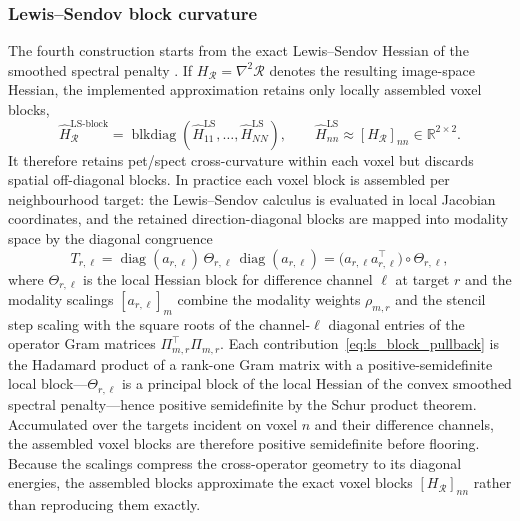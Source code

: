 \subsubsection{Lewis--Sendov block curvature}

The fourth construction starts from the exact Lewis--Sendov Hessian of the smoothed spectral penalty \cite{doi:10.1137/S089547980036838X}. If $H_{\mathcal R}=\nabla^2\mathcal R$ denotes the resulting image-space Hessian, the implemented approximation retains only locally assembled voxel blocks,
\begin{equation}
    \widehat H_{\mathcal R}^{\mathrm{LS\text{-}block}}
    =
    \operatorname{blkdiag}
    \left(
        \widehat H_{11}^{\mathrm{LS}},\ldots,\widehat H_{NN}^{\mathrm{LS}}
    \right),
    \qquad
    \widehat H_{nn}^{\mathrm{LS}}\approx[H_{\mathcal R}]_{nn}\in\mathbb R^{2\times2}.
    \label{eq:ls_block_preconditioner}
\end{equation}
It therefore retains \gls{pet}/\gls{spect} cross-curvature within each voxel but discards spatial off-diagonal blocks. In practice each voxel block is assembled per neighbourhood target: the Lewis--Sendov calculus is evaluated in local Jacobian coordinates, and the retained direction-diagonal blocks are mapped into modality space by the diagonal congruence
\begin{equation}
    T_{r,\ell}
    =
    \operatorname{diag}(a_{r,\ell})\,
    \Theta_{r,\ell}\,
    \operatorname{diag}(a_{r,\ell})
    =
    \bigl(a_{r,\ell}a_{r,\ell}^{\top}\bigr)\circ \Theta_{r,\ell},
    \label{eq:ls_block_pullback}
\end{equation}
where $\Theta_{r,\ell}$ is the local Hessian block for difference channel $\ell$ at target $r$ and the modality scalings $[a_{r,\ell}]_m$ combine the modality weights $\rho_{m,r}$ and the stencil step scaling with the square roots of the channel-$\ell$ diagonal entries of the operator Gram matrices $\Pi_{m,r}^{\top}\Pi_{m,r}$. Each contribution~\eqref{eq:ls_block_pullback} is the Hadamard product of a rank-one Gram matrix with a positive-semidefinite local block---$\Theta_{r,\ell}$ is a principal block of the local Hessian of the convex smoothed spectral penalty---hence positive semidefinite by the Schur product theorem. Accumulated over the targets incident on voxel $n$ and their difference channels, the assembled voxel blocks are therefore positive semidefinite before flooring. Because the scalings compress the cross-operator geometry to its diagonal energies, the assembled blocks approximate the exact voxel blocks $[H_{\mathcal R}]_{nn}$ rather than reproducing them exactly.

